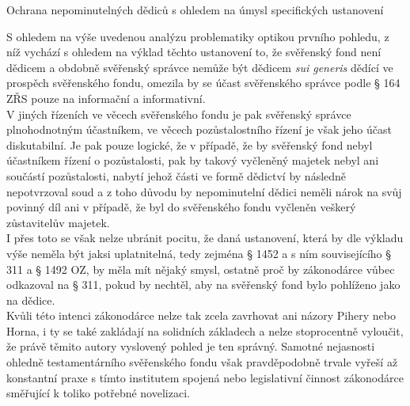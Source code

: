 \documentclass{article}
\begin{document}
 
    \begin{enumerate}
 {\Large\item[2.] Ochrana nepominutelných dědiců s ohledem na úmysl specifických ustanovení}
 \end{enumerate}
 
 
 S ohledem na výše uvedenou analýzu problematiky optikou prvního pohledu, z níž vychází s ohledem na výklad těchto ustanovení to, že svěřenský fond není dědicem a obdobně svěřenský správce nemůže být dědicem \textit{sui generis} dědící ve prospěch svěřenského fondu, omezila by se účast svěřenského správce podle § 164 ZŘS pouze na informační a informativní.\\
 
 V jiných řízeních ve věcech svěřenského fondu je pak svěřenský správce plnohodnotným účastníkem, ve věcech pozůstalostního řízení je však jeho účast diskutabilní. Je pak pouze logické, že v případě, že by svěřenský fond nebyl účastníkem řízení o pozůstalosti, pak by takový vyčleněný majetek nebyl ani součástí pozůstalosti, nabytí jehož části ve formě dědictví by následně nepotvrzoval soud a z toho důvodu by nepominutelní dědici neměli nárok na svůj povinný díl ani v případě, že byl do svěřenského fondu vyčleněn veškerý zůstavitelův majetek.\\
 
 I přes toto se však nelze ubránit pocitu, že daná ustanovení, která by dle výkladu výše neměla být jaksi uplatnitelná, tedy zejména § 1452 a s ním souvisejícího § 311 a § 1492 OZ, by měla mít nějaký smysl, ostatně proč by zákonodárce vůbec odkazoval na § 311, pokud by nechtěl, aby na svěřenský fond bylo pohlíženo jako na dědice.\\
 
 Kvůli této intenci zákonodárce nelze tak zcela zavrhovat ani názory Pihery nebo Horna, i ty se také zakládají na solidních základech a nelze stoprocentně vyloučit, že právě těmito autory vyslovený pohled je ten správný. Samotné nejasnosti ohledně testamentárního svěřenského fondu však pravděpodobně trvale vyřeší až konstantní praxe s tímto institutem spojená nebo legislativní činnost zákonodárce směřující k toliko potřebné novelizaci.\\
 
\end{document}
